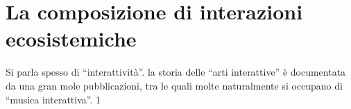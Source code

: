 \section{La composizione di interazioni ecosistemiche}
\label{sec:La composizione di interazioni ecosistemiche}

Si parla spesso di “interattività”. la storia delle “arti interattive” è documentata da una gran mole pubblicazioni, tra le
quali molte naturalmente si occupano di “musica interattiva”.
1
